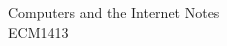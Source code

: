 \documentclass[a4paper]{report}
\begin{document}
\begin{titlepage}
	\raggedleft
	\vspace*{2cm}
	\Huge{Computers and the Internet Notes}\\
	\vspace{0.5cm}
	\large{ECM1413}
\end{titlepage}

\tableofcontents
\end{document}
